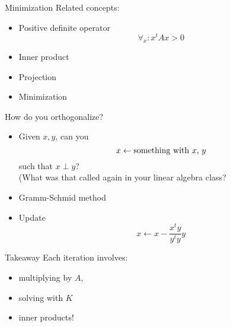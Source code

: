 \begin{frame}{Minimization}
Related concepts:
\begin{itemize}
\item Positive definite operator \[ \forall_x\colon x^tAx>0 \]
\item Inner product
\item Projection
\item Minimization
\end{itemize}
\end{frame}



\begin{frame}{How do you orthogonalize?}
  \begin{itemize}
  \item<1-> Given $x,y$, can you
    \[ x\leftarrow\hbox{something with $x$, $y$} \]
    such that $x\perp y$?\\
    (What was that called again in your linear algebra class?
  \item<2-> Gramm-Schmid method
  \item<3-> Update
    \[ x\leftarrow x - \frac{x^ty}{y^ty} y \]
  \end{itemize}  
\end{frame}

\begin{frame}{Takeaway}
  Each iteration involves:
  \begin{itemize}
  \item multiplying by $A$,
  \item solving with $K$
  \item inner products!
  \end{itemize}
\end{frame}

